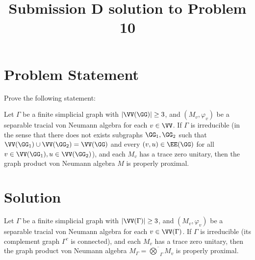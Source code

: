 \title{Submission D solution to Problem 10}
\date{}
\maketitle


\section*{Problem Statement}

Prove the following statement:

Let $\Gamma$ be a finite simplicial graph with $|\VV(\GG)|\geq 3$, and $(M_v,\varphi_v)$ be a separable tracial von Neumann algebra for each $v\in \VV$. If $\Gamma$ is irreducible (in the sense that there does not exists subgraphs $\GG_1,\GG_2$ such that $ \VV(\GG_1)\cup \VV(\GG_2)=\VV(\GG) $ and every $(v,u)\in \EE(\GG) $ for all $v\in\VV(\GG_1),u\in \VV(\GG_2)$), and each $M_v$ has a trace zero unitary, then the graph product von Neumann algebra $M$ is properly proximal.

\section*{Solution}

\begin{theorem}
Let $\Gamma$ be a finite simplicial graph with $|\VV(\Gamma)|\geq 3$, and $(M_v,\varphi_v)$ be a separable tracial von Neumann algebra for each $v\in \VV(\Gamma)$. If $\Gamma$ is irreducible (its complement graph $\Gamma^c$ is connected), and each $M_v$ has a trace zero unitary, then the graph product von Neumann algebra $M_\Gamma = \overline{\bigotimes}_\Gamma M_v$ is properly proximal.
\end{theorem}

